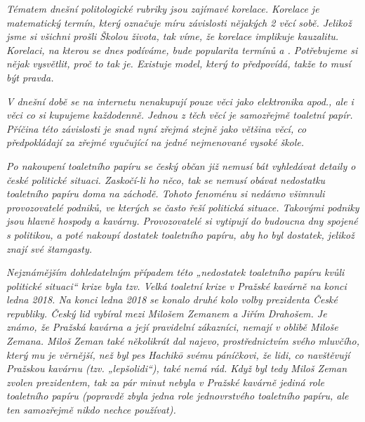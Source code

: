 \documentclass[12pt, a4paper]{article}
\begin{document}
\textit{Tématem dnešní politologické rubriky jsou zajímavé korelace. Korelace je matematický termín, který označuje míru závislosti nějakých 2 věcí sobě. Jelikož jsme si všichni prošli Školou života, tak víme, že korelace implikuje kauzalitu. Korelaci, na kterou se dnes podíváme, bude popularita termínů  a . Potřebujeme si nějak vysvětlit, proč to tak je. Existuje model, který to předpovídá, takže to musí být pravda. }

\textit{V dnešní době se na internetu nenakupují pouze věci jako elektronika apod., ale i věci co si kupujeme každodenně. Jednou z těch věcí je samozřejmě toaletní papír. Příčina této závislosti je snad nyní zřejmá stejně jako většina věcí, co předpokládají za zřejmé vyučující na jedné nejmenované vysoké škole.}

\textit{Po nakoupení toaletního papíru se český občan již nemusí bát vyhledávat detaily o české politické situaci. Zaskočí-li ho něco, tak se nemusí obávat nedostatku toaletního papíru doma na záchodě. Tohoto fenoménu si nedávno všimnuli provozovatelé podniků, ve kterých se často řeší politická situace. Takovými podniky jsou hlavně hospody a kavárny. Provozovatelé si vytipují do budoucna dny spojené s politikou, a poté nakoupí dostatek toaletního papíru, aby ho byl dostatek, jelikož znají své štamgasty.}

\textit{Nejznámějším dohledatelným případem této „nedostatek toaletního papíru kvůli politické situaci“ krize byla tzv. Velká toaletní krize v Pražské kavárně na konci ledna 2018. Na konci ledna 2018 se konalo druhé kolo volby prezidenta České republiky. Český lid vybíral mezi Milošem Zemanem a Jiřím Drahošem. Je známo, že Pražská kavárna a její pravidelní zákazníci, nemají v oblibě Miloše Zemana. Miloš Zeman také několikrát dal najevo, prostřednictvím svého mluvčího, který mu je věrnější, než byl pes Hachikō svému páníčkovi, že lidi, co navštěvují Pražskou kavárnu (tzv. „lepšolidi“), také nemá rád. Když byl tedy Miloš Zeman zvolen prezidentem, tak za pár minut nebyla v Pražské kavárně jediná role toaletního papíru (popravdě zbyla jedna role jednovrstvého toaletního papíru, ale ten samozřejmě nikdo nechce používat).}
\end{document}
